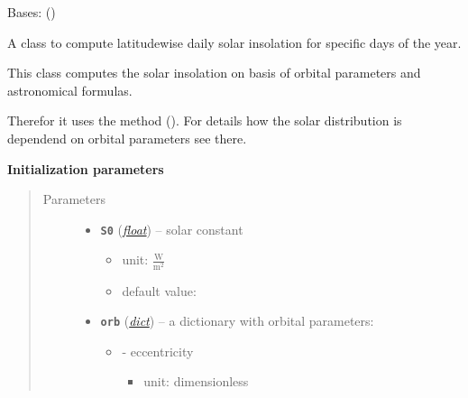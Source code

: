\documentclass[a4paper,10pt,english]{sphinxmanual}
\begin{document}
\begin{fulllineitems}
\label{api/climlab.radiation:climlab.radiation.insolation.DailyInsolation}
Bases: {\hyperref[api/climlab.radiation:climlab.radiation.insolation.AnnualMeanInsolation]{\emph{}}} ()

A class to compute latitudewise daily solar insolation for specific 
days of the year.

This class computes the solar insolation on basis of orbital parameters and 
astronomical formulas.

Therefor it uses the method {\hyperref[api/climlab.solar:climlab.solar.insolation.daily_insolation]{\emph{}}} ().
For details how the solar distribution is dependend on orbital parameters 
see there.

\textbf{Initialization parameters}
\begin{quote}\begin{description}
\item[{Parameters}] \leavevmode\begin{itemize}
\item {} 
\textbf{\texttt{S0}} (\href{http://docs.python.org/2.7/library/functions.html\#float}{\emph{float}}) -- 
solar constant
\begin{itemize}
\item {} 
unit: \(\frac{\textrm{W}}{\textrm{m}^2}\)

\item {} 
default value: 

\end{itemize}


\item {} 
\textbf{\texttt{orb}} (\href{http://docs.python.org/2.7/library/stdtypes.html\#dict}{\emph{dict}}) -- 
a dictionary with orbital parameters:
\begin{itemize}
\item {} 
 - eccentricity
\begin{itemize}
\item {} 
unit: dimensionless


\end{itemize}
\end{itemize}
\end{itemize}
\end{description}
\end{quote}
\end{fulllineitems}
\end{document}
